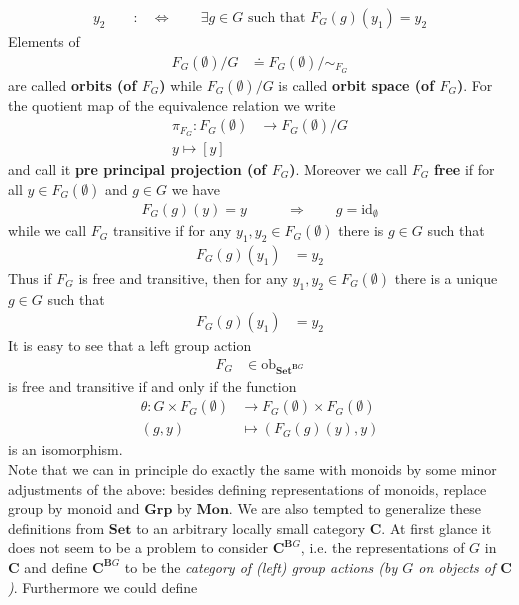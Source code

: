 \begin{exa}
\begin{align*}
  y_{2}
  \qquad
  :&\Leftrightarrow
  \qquad
  \exists
  g
  \in
  G
  \text{ such that }
  F_{G}(g)(y_{1})
  =
  y_{2}
\end{align*}
Elements of
\begin{align*}
  F_{G}(\emptyset)
  \slash
  G
  &\doteq
  F_{G}(\emptyset)
  \slash
  \sim_{F_{G}}
\end{align*}
are called \textbf{orbits (of $F_{G}$)} while $F_{G}(\emptyset) \slash G$ is called \textbf{orbit space (of $F_{G}$)}. For the quotient map of the equivalence relation we write
\begin{align*}
  \pi_{F_{G}}
  \colon
  F_{G}(\emptyset)
  &\rightarrow
  F_{G}(\emptyset)
  \slash
  G
  \\
  y
  \mapsto
  [y]
\end{align*}
and call it \textbf{pre principal projection (of $F_{G}$)}. Moreover we call $F_{G}$ \textbf{free} if for all $y \in F_{G}(\emptyset)$ and $g \in G$ we have
\begin{align*}
  F_{G}(g)(y)
  =
  y
  \qquad
  &\Rightarrow
  \qquad
  g
  =
  \mathrm{id}_{\emptyset}
\end{align*}
while we call $F_{G}$ transitive if for any $y_{1},y_{2} \in F_{G}(\emptyset)$ there is $g \in G$ such that
\begin{align*}
  F_{G}(g)(y_{1})
  &=
  y_{2}
\end{align*}
Thus if $F_{G}$ is free and transitive, then for any $y_{1},y_{2} \in F_{G}(\emptyset)$ there is a unique $g \in G$ such that
\begin{align*}
  F_{G}(g)(y_{1})
  &=
  y_{2}
\end{align*}
It is easy to see that a left group action
\begin{align*}
  F_{G}
  &\in
  \mathrm{ob}_{\mathbf{Set}^{\mathbf{B}G}}
\end{align*}
is free and transitive if and only if the function
\begin{align*}
  \theta
  \colon
  G
  \times
  F_{G}(\emptyset)
  &\rightarrow
  F_{G}(\emptyset)
  \times
  F_{G}(\emptyset)
  \\
  (g,y)
  &\mapsto
  \left(
    F_{G}(g)(y),
    y
  \right)
\end{align*}
is an isomorphism.
\\
Note that we can in principle do exactly the same with monoids by some minor adjustments of the above: besides defining representations of monoids, replace group by monoid and $\mathbf{Grp}$ by $\mathbf{Mon}$. We are also tempted to generalize these definitions from $\mathbf{Set}$ to an arbitrary locally small category $\mathbf{C}$. At first glance it does not seem to be a problem to consider $\mathbf{C}^{\mathbf{B}G}$, i.e. the representations of $G$ in $\mathbf{C}$ and define $\mathbf{C}^{\mathbf{B}G}$ to be the \textit{category of (left) group actions (by $G$ on objects of $\mathbf{C}$)}. Furthermore we could define

\end{exa}
